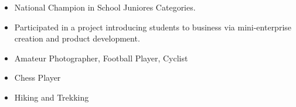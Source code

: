 

\begin{cventries}


\begin{itemize}
  \item National Champion in School Juniores Categories.
\end{itemize}

\begin{itemize}
  \item Participated in a project introducing students to business via mini-enterprise creation and product development.
\end{itemize}


\begin{itemize}
  \item Amateur Photographer, Football Player, Cyclist
  \item Chess Player
  \item Hiking and Trekking
\end{itemize}
\end{cventries}
